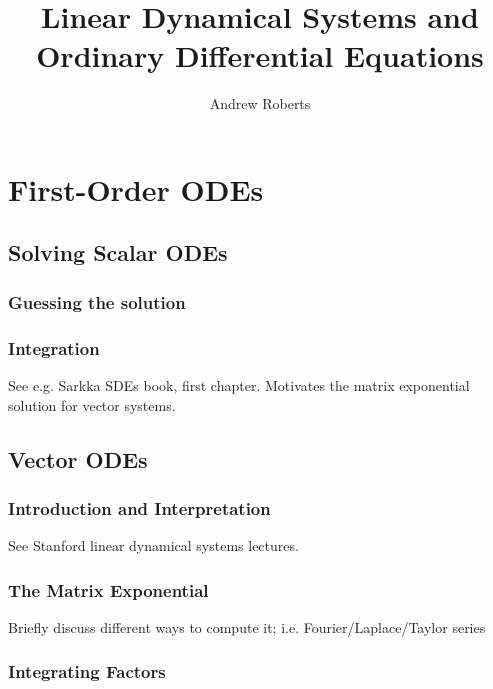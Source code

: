 \documentclass[12pt]{article}
\title{Linear Dynamical Systems and Ordinary Differential Equations}
\author{Andrew Roberts}
\begin{document}
\maketitle
\tableofcontents
\newpage

\section{First-Order ODEs}

\subsection{Solving Scalar ODEs}

\subsubsection{Guessing the solution}

\subsubsection{Integration}
See e.g. Sarkka SDEs book, first chapter. Motivates the matrix exponential solution for vector systems. 

\subsection{Vector ODEs}

\subsubsection{Introduction and Interpretation}
See Stanford linear dynamical systems lectures. 

\subsubsection{The Matrix Exponential}
Briefly discuss different ways to compute it; i.e. Fourier/Laplace/Taylor series

\subsubsection{Integrating Factors}


\end{document}
